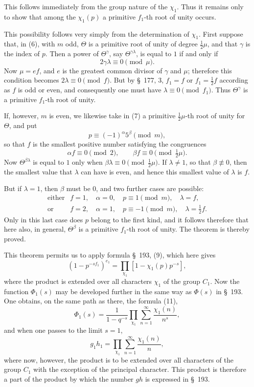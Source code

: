 \documentclass[11pt]{article}
\begin{document}
This follows immediately from the group nature of the $\chi_1$. Thus it remains only to show that among the $\chi_1(p)$ a primitive $f_1$-th root of unity occurs.

This possibility follows very simply from the determination of $\chi_1$. First suppose that, in (6), with $m$ odd, $\Theta$ is a primitive root of unity of degree $\frac12\mu$, and that $\gamma$ is the index of $p$. Then a power of $\Theta^\gamma$, say $\Theta^{\gamma\lambda}$, is equal to $1$ if and only if
\[
2\gamma\lambda\equiv0\pmod\mu.
\]
Now $\mu=ef$, and $e$ is the greatest common divisor of $\gamma$ and $\mu$; therefore this condition becomes $2\lambda\equiv0\pmod f$. But by \S~177, 3, $f_1=f$ or $f_1=\frac12 f$ according as $f$ is odd or even, and consequently one must have $\lambda\equiv0\pmod {f_1}$. Thus $\Theta^\gamma$ is a primitive $f_1$-th root of unity.

If, however, $m$ is even, we likewise take in (7) a primitive $\frac12\mu$-th root of unity for $\Theta$, and put
\[
p\equiv(-1)^\alpha5^\beta\pmod m,
\]
so that $f$ is the smallest positive number satisfying the congruences
\[
\alpha f\equiv0\pmod2,
\qquad
\beta f\equiv0\pmod{\tfrac12\mu}.
\]
Now $\Theta^{\beta\lambda}$ is equal to $1$ only when $\beta\lambda\equiv0\pmod{\frac12\mu}$. If $\lambda\ne1$, so that $\beta\not\equiv0$, then the smallest value that $\lambda$ can have is even, and hence this smallest value of $\lambda$ is $f$.

But if $\lambda=1$, then $\beta$ must be $0$, and two further cases are possible:
\[
\begin{array}{ll}
\text{either} & f=1,\quad \alpha=0,\quad p\equiv1\pmod m,\quad \lambda=f,\\[2mm]
\text{or} & f=2,\quad \alpha=1,\quad p\equiv-1\pmod m,\quad \lambda=\frac12f.
\end{array}
\]
Only in this last case does $p$ belong to the first kind, and it follows therefore that here also, in general, $\Theta^\beta$ is a primitive $f_1$-th root of unity. The theorem is thereby proved.

This theorem permits us to apply formula \S~193, (9), which here gives
\begin{equation}
(1-p^{-sf_1})^{e_1}=\prod_{\chi_1}[1-\chi_1(p)p^{-s}],
\tag{8}
\end{equation}
where the product is extended over all characters $\chi_1$ of the group $C_1$. Now the function $\Phi_1(s)$ may be developed further in the same way as $\Phi(s)$ in \S~193. One obtains, on the same path as there, the formula (11),
\begin{equation}
\Phi_1(s)=\frac1{1-q^{-s}}\prod_{\chi_1}\sum_{n=1}^{\infty}\frac{\chi_1(n)}{n^s},
\tag{9}
\end{equation}
and when one passes to the limit $s=1$,
\begin{equation}
g_1h_1=\prod_{\chi_1}\sum_{n=1}^{\infty}\frac{\chi_1(n)}{n},
\tag{10}
\end{equation}
where now, however, the product is to be extended over all characters of the group $C_1$ with the exception of the principal character. This product is therefore a part of the product by which the number $gh$ is expressed in \S~193.
\end{document}
